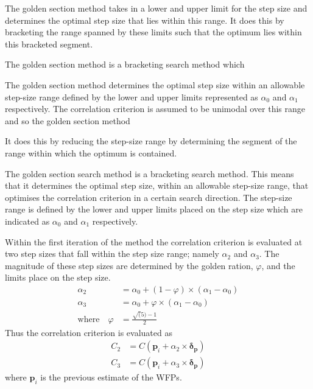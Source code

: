 \documentclass[12pt,oneside,openany,a4paper, %
english, %
masters-t, goldenblock]{usthesis}
\begin{document}
The golden section method takes in a lower and upper limit for the step size and determines the optimal step size that lies within this range. It does this by bracketing the range spanned by these limits such that the optimum lies within this bracketed segment.

The golden section method is a bracketing search method which 

The golden section method determines the optimal step size within an allowable step-size range defined by the lower and upper limits represented as $\alpha_0$ and $\alpha_1$ respectively. The correlation criterion is assumed to be unimodal over this range and so the golden section method 

It does this by reducing the step-size range by determining the segment of the range within which the optimum is contained.

The golden section search method is a bracketing search method. This means that it determines the optimal step size, within an allowable step-size range, that optimises the correlation criterion in a certain search direction. The step-size range is defined by the lower and upper limits placed on the step size which are indicated as $\alpha_0$ and $\alpha_1$ respectively.

Within the first iteration of the method the correlation criterion is evaluated at two step sizes that fall within the step size range; namely $\alpha_2$ and $\alpha_3$. The magnitude of these step sizes are determined by the golden ration, $\varphi$, and the limits place on the step size.
\begin{align}
  \label{eq: GS 1}
  \alpha_2 &=\alpha_0+(1-\varphi) \times (\alpha_1-\alpha_0) \\
  \label{eq: GS 2}
  \alpha_3 &= \alpha_0+\varphi \times (\alpha_1-\alpha_0) \\
  \text{where} \quad \varphi &= \frac{\sqrt(5)-1}{2}
\end{align}
Thus the correlation criterion is evaluated as 
\begin{align}
    C_2 &=C(\bm{p}_i + \alpha_2 \times \bm{\delta_p}) \\
    C_3 &=C(\bm{p}_i + \alpha_3 \times \bm{\delta_p})
\end{align}
where $\bm{p}_i$ is the previous estimate of the WFPs.
\end{document}
